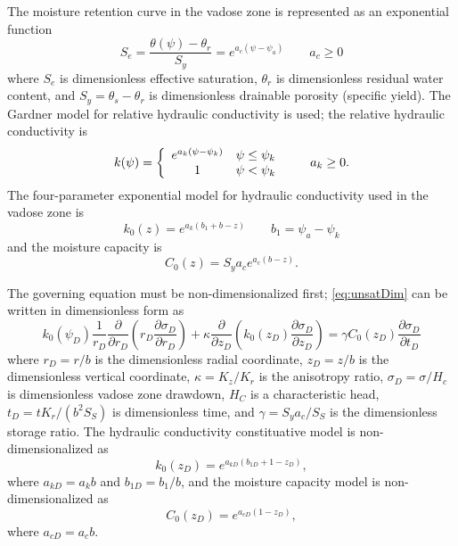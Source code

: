 \documentclass[12pt,letterpaper]{article}
\begin{document}
The moisture retention curve in the vadose zone is represented as an exponential function
\begin{equation}\nonumber
S_e = \frac{\theta(\psi) - \theta_r}{S_y} = e^{a_c \left( \psi - \psi_a \right)} \qquad a_c \ge 0 
\end{equation}
where $S_e$ is dimensionless effective saturation, $\theta_r$ is dimensionless residual water content, and $S_y=\theta_s - \theta_r$ is dimensionless drainable porosity (specific yield).  The Gardner model for relative hydraulic conductivity is used; the relative hydraulic conductivity is
\begin{equation}
  \nonumber
  k(\psi) = \left  \{ 
    \begin{array}{c c}
      e^{a_k \left( \psi - \psi_k\right)} & \psi \le \psi_k \\
      1 & \psi < \psi_k\\
    \end{array} 
\right . \qquad a_k \ge 0.
\end{equation}
The four-parameter exponential model for hydraulic conductivity used in the vadose zone is 
\begin{equation}
  \label{eq:Gardner}
 k_0(z)=e^{a_k\left( b_1 + b - z\right)} \qquad b_1=\psi_a-\psi_k
\end{equation}
and the moisture capacity is
\begin{equation}
  \label{eq:mrc}
C_0(z) = S_y a_c e^{a_c \left( b-z\right)}.
\end{equation}

The governing equation  must be non-dimensionalized first; \eqref{eq:unsatDim} can be written in dimensionless form as
\begin{equation}
  \label{eq:unsatDimless}
  k_0(\psi_D) \frac{1}{r_D} \frac{\partial}{\partial r_D} \left( r_D\frac{\partial \sigma_D}{\partial r_D} \right) + \kappa \frac{\partial}{\partial z_D} \left( k_0(z_D) \frac{\partial \sigma_D}{\partial z_D}\right) = \gamma C_0(z_D) \frac{\partial \sigma_D}{\partial t_D}
\end{equation}
where $r_D=r/b$ is the dimensionless radial coordinate, $z_D=z/b$ is the dimensionless vertical coordinate, $\kappa=K_z/K_r$ is the anisotropy ratio, $\sigma_D = \sigma/H_c$ is dimensionless vadose zone drawdown, $H_C$ is a characteristic head, $t_D = t K_r / (b^2 S_S)$ is dimensionless time, and $\gamma = S_y a_c/S_S$ is the dimensionless storage ratio.  The hydraulic conductivity constituative model is non-dimensionalized as
\begin{equation}
  \label{eq:GardnerDimless}
 k_0(z_D)=e^{a_{kD} \left( b_{1D} + 1 - z_D \right)},
\end{equation}
where $a_{kD} = a_k b$ and $b_{1D}=b_1/b$, and the moisture capacity model is non-dimensionalized as
\begin{equation}
  \label{eq:mrcDimless}
C_0(z_D) = e^{a_{cD} \left( 1-z_D\right)},
\end{equation}
where $a_{cD} = a_c b$.
\end{document}
